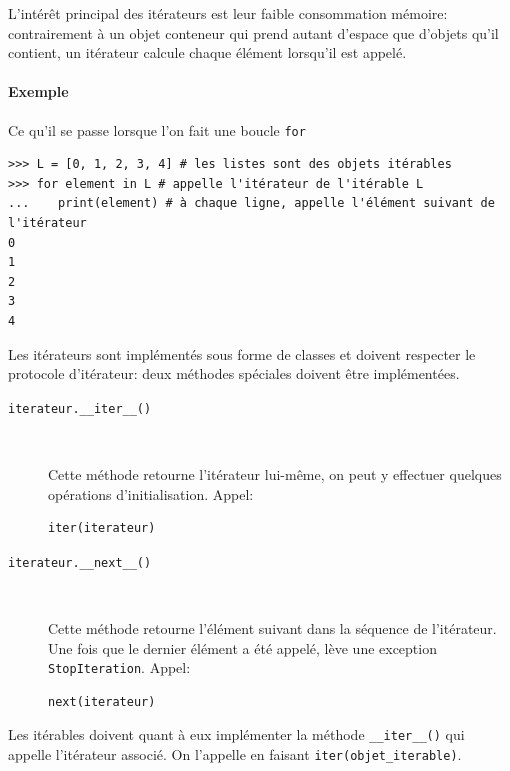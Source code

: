 \documentclass[a4paper, 10pt]{article}
\begin{document}
L'intérêt principal des itérateurs est leur faible consommation mémoire: contrairement à un objet conteneur qui prend autant d'espace que d'objets qu'il contient, un itérateur calcule chaque élément lorsqu'il est appelé.

\paragraph{Exemple} Ce qu'il se passe lorsque l'on fait une boucle \texttt{for}
\begin{verbatim}
>>> L = [0, 1, 2, 3, 4] # les listes sont des objets itérables
>>> for element in L # appelle l'itérateur de l'itérable L
...    print(element) # à chaque ligne, appelle l'élément suivant de l'itérateur
0
1
2
3
4
\end{verbatim}

Les itérateurs sont implémentés sous forme de classes et doivent respecter le protocole d'itérateur: deux méthodes spéciales doivent être implémentées.
\begin{description}
    \item[\texttt{iterateur.__iter__()}]~

    Cette méthode retourne l'itérateur lui-même, on peut y effectuer quelques opérations d’initialisation. Appel:
    \begin{verbatim}
iter(iterateur)
    \end{verbatim}

    \item[\texttt{iterateur.__next__()}]~

    Cette méthode retourne l'élément suivant dans la séquence de l'itérateur. Une fois que le dernier élément a été appelé, lève une exception \texttt{StopIteration}. Appel:
    \begin{verbatim}
next(iterateur)
    \end{verbatim}
\end{description}

Les itérables doivent quant à eux implémenter la méthode \texttt{__iter__()} qui appelle l'itérateur associé. On l'appelle en faisant \texttt{iter(objet_iterable)}.
\end{document}

